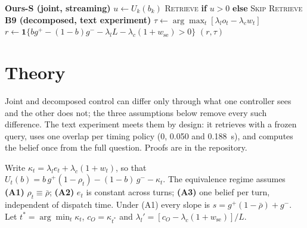 \begin{algorithm}[t]
\caption{Ours-S (\textsc{commit}) and the decomposed B9, one turn}
\label{alg:oursv2}
\begin{algorithmic}[1]
\Statex \textbf{Ours-S (joint, streaming)}
  \State $u\gets U_k(b_k)$ 
   \Return \textsc{Retrieve} \textbf{if} $u>0$ \textbf{else} \textsc{Skip}
  \EndIf
   \Return \textsc{Retrieve} 
  \EndIf
\EndFor
\Statex \textbf{B9 (decomposed, text experiment)}
\State $\tau\gets\arg\max_t[\lambda_l o_t-\lambda_c w_t]$ 
\State $r\gets\mathbf 1\{b g^{+}-(1-b)g^{-}-\lambda_l L-\lambda_c(1+w_{\mathrm{se}})>0\}$ 
\State \Return $(r,\tau)$
\end{algorithmic}
\end{algorithm}

\section{Theory}\label{sec:theory}
Joint and decomposed control can differ only through what one controller sees
and the other does not; the three assumptions below remove every such
difference. The text experiment meets them by design: it retrieves with a
frozen query, uses one overlap per timing policy (0, 0.050 and 0.188~s), and
computes the belief once from the full question. Proofs are in the repository.

Write $\kappa_t=\lambda_l e_t+\lambda_c(1+w_t)$, so that
$U_t(b)=b\,g^{+}(1-\rho_t)-(1-b)\,g^{-}-\kappa_t$. The equivalence regime assumes
\textbf{(A1)} $\rho_t\equiv\bar\rho$;
\textbf{(A2)} $e_t$ is constant across turns;
\textbf{(A3)} one belief per turn, independent of dispatch time.
Under (A1) every slope is $s=g^{+}(1-\bar\rho)+g^{-}$. Let
$t^{*}=\arg\min_t\kappa_t$, $c_O=\kappa_{t^{*}}$ and
$\lambda_l'=[c_O-\lambda_c(1+w_{\mathrm{se}})]/L$.

